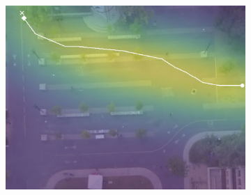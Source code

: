 \documentclass[usenames,dvipsnames]{article}
\begin{document}
\begin{enumerate}
\begin{item}
\begin{figure}[t!]
\begin{subfigure}[t]{0.5\textwidth}
	\begin{minipage}[c]{0.3\linewidth}
		\includegraphics[width=\linewidth]{./figures/bookstore/ours_1_2_t=370.jpg}
	\end{minipage}
	

\end{subfigure}
\end{figure}
\end{item}
\end{enumerate}
\end{document}
